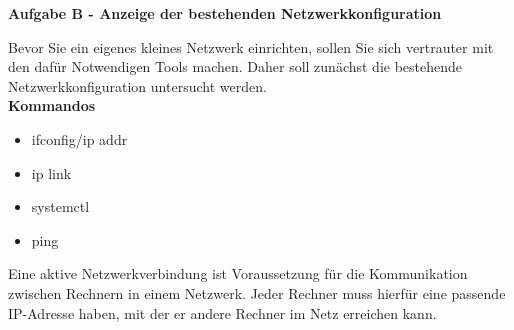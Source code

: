 \documentclass[paper=a4,fontsize=11pt]{scrartcl}%
\numberwithin{equation}{section}
\begin{document}
\begin{center}
\Large{\textbf{Aufgabe B - Anzeige der bestehenden Netzwerkkonfiguration}}
\end{center}\vskip0.25in
Bevor Sie ein eigenes kleines Netzwerk einrichten, sollen Sie sich vertrauter mit den dafür Notwendigen Tools machen. Daher soll zunächst die bestehende Netzwerkkonfiguration untersucht werden.\\
\textbf{Kommandos}
\begin{multicols}{3}
\begin{itemize}
	\item ifconfig/ip addr
	\item ip link
	\item systemctl
	\item ping
\end{itemize}
\end{multicols}
Eine aktive Netzwerkverbindung ist Voraussetzung für die Kommunikation zwischen Rechnern in einem Netzwerk. Jeder Rechner muss hierfür eine passende IP-Adresse haben, mit der er andere Rechner im Netz erreichen kann. 
\end{document}
